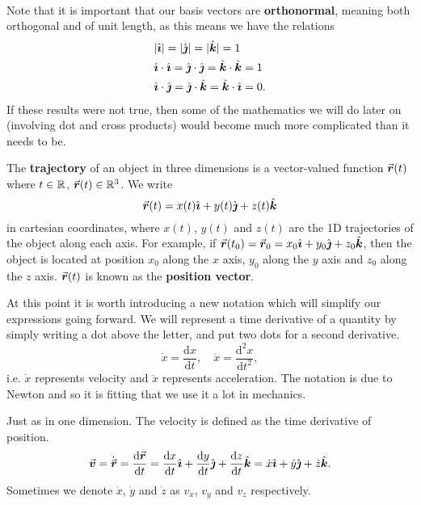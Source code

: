 \documentclass[../newtonian_mechanics.tex]{subfiles}
\begin{document}
        \paragraph{}
        Note that it is important that our basis vectors are \textbf{orthonormal}, meaning both orthogonal and of unit length, as this means we have the relations
        \begin{align*}
            &\lvert\hat{\boldsymbol{\imath}}\rvert=\lvert\hat{\boldsymbol{\jmath}}\rvert=\lvert\hat{\boldsymbol{k}}\rvert=1\\
            &\hat{\boldsymbol{\imath}}\cdot\hat{\boldsymbol{\imath}}=\hat{\boldsymbol{\jmath}}\cdot\hat{\boldsymbol{\jmath}}=\hat{\boldsymbol{k}}\cdot\hat{\boldsymbol{k}}=1\\
            &\hat{\boldsymbol{\imath}}\cdot\hat{\boldsymbol{\jmath}}=\hat{\boldsymbol{\jmath}}\cdot\hat{\boldsymbol{k}}=\hat{\boldsymbol{k}}\cdot\hat{\boldsymbol{\imath}}=0.
        \end{align*}
        If these results were not true, then some of the mathematics we will do later on (involving dot and cross products) would become much more complicated than it needs to be.
        \begin{definition}
            The \textbf{trajectory} of an object in three dimensions is a vector-valued function $\vec{\boldsymbol r}(t)$ where $t\in\mathbb{R}$, $\vec{\boldsymbol r}(t)\in\mathbb{R}^3$. We write
            \begin{equation}
                \vec{\boldsymbol r}(t)=x(t)\hat{\boldsymbol{\imath}}+y(t)\hat{\boldsymbol{\jmath}}+z(t)\hat{\boldsymbol{k}}
            \end{equation}
            in cartesian coordinates, where $x(t)$, $y(t)$ and $z(t)$ are the 1D trajectories of the object along each axis. For example, if $\vec{\boldsymbol r}(t_0)=\vec{\boldsymbol r}_0=x_0\hat{\boldsymbol{\imath}}+y_0\hat{\boldsymbol{\jmath}}+z_0\hat{\boldsymbol{k}}$, then the object is located at position $x_0$ along the $x$ axis, $y_0$ along the $y$ axis and $z_0$ along the $z$ axis. $\vec{\boldsymbol r}(t)$ is known as the \textbf{position vector}.
        \end{definition}
        At this point it is worth introducing a new notation which will simplify our expressions going forward. We will represent a time derivative of a quantity by simply writing a dot above the letter, and put two dots for a second derivative.
        \begin{equation*}
            \dot{x}=\frac{\mathrm{d}x}{\mathrm{d}t},\quad\ddot{x}=\frac{\mathrm{d}^2x}{\mathrm{d}t^2},
        \end{equation*}
        i.e. $\dot x$ represents velocity and $\ddot x$ represents acceleration. The notation is due to Newton and so it is fitting that we use it a lot in mechanics.
        \begin{definition}
            Just as in one dimension. The velocity is defined as the time derivative of position.
            \begin{equation}
                \vec{\boldsymbol v}=\dot{\vec{\boldsymbol r}}=\frac{\mathrm{d}\vec{\boldsymbol r}}{\mathrm{d}t}=\frac{\mathrm{d}x}{\mathrm{d}t}\hat{\boldsymbol{\imath}}+\frac{\mathrm{d}y}{\mathrm{d}t}\hat{\boldsymbol{\jmath}}+\frac{\mathrm{d}z}{\mathrm{d}t}\hat{\boldsymbol{k}}=\dot{x}\hat{\boldsymbol{\imath}}+\dot{y}\hat{\boldsymbol{\jmath}}+\dot{z}\hat{\boldsymbol{k}}.
            \end{equation}
            Sometimes we denote $\dot{x}$, $\dot{y}$ and $\dot{z}$ as $v_x$, $v_y$ and $v_z$ respectively.
        \end{definition}
\end{document}
